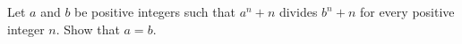Let $a$ and $b$ be positive integers such that $a^n + n$ divides $b^n + n$ for every positive integer $n$. Show that $a = b$.
